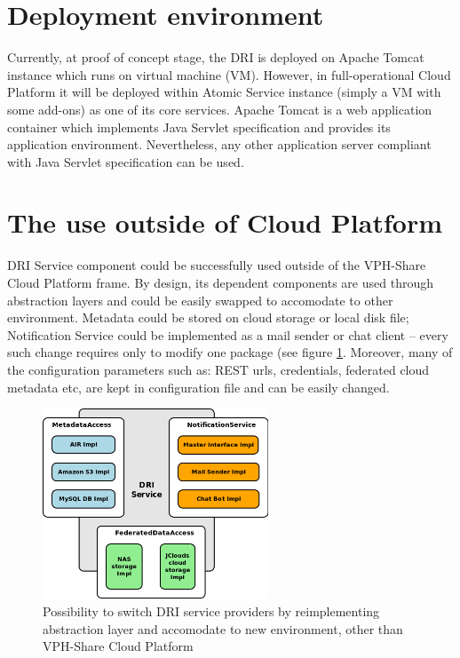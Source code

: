 \section{Deployment environment}
Currently, at proof of concept stage, the DRI is deployed on Apache Tomcat
\cite{apache-tomcat} instance which runs on virtual machine (VM). However, in
full-operational Cloud Platform it will be deployed within Atomic Service
instance (simply a VM with some add-ons) as one of its core services. Apache
Tomcat is a web application container which implements Java Servlet
specification and provides its application environment. Nevertheless, any other
application server compliant with Java Servlet specification can be used.

\section{The use outside of Cloud Platform}
DRI Service component could be successfully used outside of the VPH-Share Cloud Platform
frame. By design, its dependent components are used through abstraction layers and could
be easily swapped to accomodate to other environment. Metadata could be stored on
cloud storage or local disk file; Notification Service could be implemented as a mail sender
or chat client -- every such change requires only to modify one package (see figure 
\ref{fig:dri-ability-to-change}. Moreover, many of the configuration parameters such as:
REST urls, credentials, federated cloud metadata etc, are kept in configuration file and
can be easily changed.

\begin{figure}[h!]
	\centering
	\includegraphics[width=0.6\textwidth]{images/DRI-ability-to-change.png}
	\caption{Possibility to switch DRI service providers by reimplementing abstraction
	layer and accomodate to new environment, other than VPH-Share Cloud Platform}
	\label{fig:dri-ability-to-change}
\end{figure}

